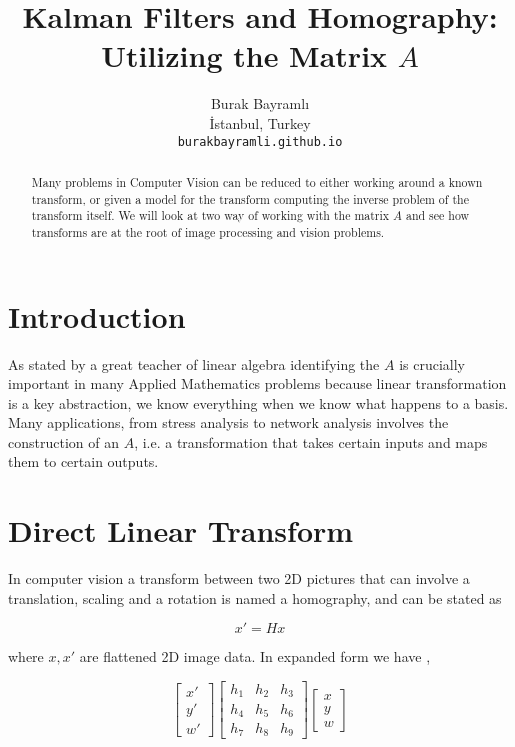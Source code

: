 \documentclass{article}
\title{Kalman Filters and Homography: Utilizing the Matrix $A$}
\author{
  Burak Bayramlı \\
  İstanbul, Turkey\\
  \texttt{burakbayramli.github.io} 
}
\begin{document}
\maketitle

\begin{abstract}
Many problems in Computer Vision can be reduced to either working around a known
transform, or given a model for the transform computing the inverse problem of
the transform itself. We will look at two way of working with the matrix $A$ and
see how transforms are at the root of image processing and vision problems.
\end{abstract}



\section{Introduction}

As stated by a great teacher of linear algebra identifying the $A$ is crucially
important in many Applied Mathematics problems \cite{strang} because linear
transformation is a key abstraction, we know everything when we know what
happens to a basis. Many applications, from stress analysis to network analysis
involves the construction of an $A$, i.e. a transformation that takes certain
inputs and maps them to certain outputs.

\section{Direct Linear Transform}

In computer vision a transform between two 2D pictures that can involve a
translation, scaling and a rotation is named a homography, and can be stated as

$$ x' = H x$$

where $x,x'$ are flattened 2D image data. In expanded form we have \cite{solem},

$$ 
\left[\begin{array}{r} x' \\ y' \\ w' \end{array}\right]
\left[\begin{array}{rrr}
h_1 & h_2 & h_3 \\
h_4 & h_5 & h_6 \\
h_7 & h_8 & h_9 
\end{array}\right]
\left[\begin{array}{r} x \\ y \\ w \end{array}\right]
$$
\end{document}
